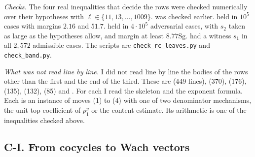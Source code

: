 \documentclass[11pt]{article}
\newcommand{\Sg}{\mathrm{Sg}}
\theoremstyle{definition}
\theoremstyle{remark}
\begin{document}
\noindent\emph{Checks.} The four real inequalities that decide the rows were checked numerically over their hypotheses with $\ell\in\{11,13,\dots,1009\}$.  was checked earlier.  held in $10^5$ cases with margins $2.16$ and $51.7$.  held in $4\cdot10^5$ adversarial cases, with $s_2$ taken as large as the hypotheses allow, and margin at least $8.77\Sg$.  had a witness $s_1$ in all $2{,}572$ admissible cases. The scripts are \texttt{check\_rc\_leaves.py} and \texttt{check\_band.py}.

\noindent\emph{What was not read line by line.} I did not read line by line the bodies of the rows other than the first and the end of the third. These are  (449 lines),  (370),  (176),  (135),  (132),  (85) and . For each I read the skeleton and the exponent formula. Each is an instance of moves (1) to (4) with one of two denominator mechanisms, the unit top coefficient of $p_1^y$ or the content estimate. Its arithmetic is one of the inequalities checked above.

\subsection*{C-I. From cocycles to Wach vectors}
\end{document}
